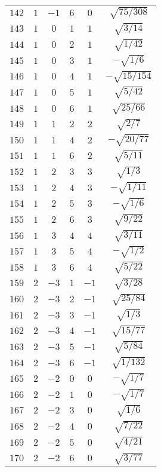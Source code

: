 \begin{table}
\begin{center}
\begin{tabular}{|c|c|c|c|c|c|}
$142$ & $1$ & $-1$ & $6$ & $0$ & $\sqrt{75/308}$ \\ 
$143$ & $1$ & $0$ & $1$ & $1$ & $\sqrt{3/14}$ \\ 
$144$ & $1$ & $0$ & $2$ & $1$ & $\sqrt{1/42}$ \\ 
$145$ & $1$ & $0$ & $3$ & $1$ & $-\sqrt{1/6}$ \\ 
$146$ & $1$ & $0$ & $4$ & $1$ & $-\sqrt{15/154}$ \\ 
$147$ & $1$ & $0$ & $5$ & $1$ & $\sqrt{5/42}$ \\ 
$148$ & $1$ & $0$ & $6$ & $1$ & $\sqrt{25/66}$ \\ 
$149$ & $1$ & $1$ & $2$ & $2$ & $\sqrt{2/7}$ \\ 
$150$ & $1$ & $1$ & $4$ & $2$ & $-\sqrt{20/77}$ \\ 
$151$ & $1$ & $1$ & $6$ & $2$ & $\sqrt{5/11}$ \\ 
$152$ & $1$ & $2$ & $3$ & $3$ & $\sqrt{1/3}$ \\ 
$153$ & $1$ & $2$ & $4$ & $3$ & $-\sqrt{1/11}$ \\ 
$154$ & $1$ & $2$ & $5$ & $3$ & $-\sqrt{1/6}$ \\ 
$155$ & $1$ & $2$ & $6$ & $3$ & $\sqrt{9/22}$ \\ 
$156$ & $1$ & $3$ & $4$ & $4$ & $\sqrt{3/11}$ \\ 
$157$ & $1$ & $3$ & $5$ & $4$ & $-\sqrt{1/2}$ \\ 
$158$ & $1$ & $3$ & $6$ & $4$ & $\sqrt{5/22}$ \\ 
$159$ & $2$ & $-3$ & $1$ & $-1$ & $\sqrt{3/28}$ \\ 
$160$ & $2$ & $-3$ & $2$ & $-1$ & $\sqrt{25/84}$ \\ 
$161$ & $2$ & $-3$ & $3$ & $-1$ & $\sqrt{1/3}$ \\ 
$162$ & $2$ & $-3$ & $4$ & $-1$ & $\sqrt{15/77}$ \\ 
$163$ & $2$ & $-3$ & $5$ & $-1$ & $\sqrt{5/84}$ \\ 
$164$ & $2$ & $-3$ & $6$ & $-1$ & $\sqrt{1/132}$ \\ 
$165$ & $2$ & $-2$ & $0$ & $0$ & $-\sqrt{1/7}$ \\ 
$166$ & $2$ & $-2$ & $1$ & $0$ & $-\sqrt{1/7}$ \\ 
$167$ & $2$ & $-2$ & $3$ & $0$ & $\sqrt{1/6}$ \\ 
$168$ & $2$ & $-2$ & $4$ & $0$ & $\sqrt{7/22}$ \\ 
$169$ & $2$ & $-2$ & $5$ & $0$ & $\sqrt{4/21}$ \\ 
$170$ & $2$ & $-2$ & $6$ & $0$ & $\sqrt{3/77}$ \\ 

\end{tabular}
\end{center}
\end{table}
